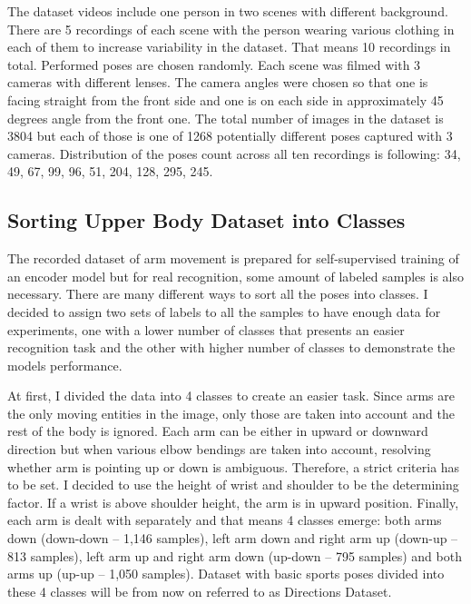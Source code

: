 The dataset videos include one person in two scenes with different background. There are 5 recordings of each scene with the person wearing various clothing in each of them to increase variability in the dataset. That means 10 recordings in total. Performed poses are chosen randomly. Each scene was filmed with 3 cameras with different lenses. The camera angles were chosen so that one is facing straight from the front side and one is on each side in approximately 45 degrees angle from the front one. The total number of images in the dataset is 3804 but each of those is one of 1268 potentially different poses captured with 3 cameras. Distribution of the poses count across all ten recordings is following: 34, 49, 67, 99, 96, 51, 204, 128, 295, 245.

\subsection{\label{sec:dataset-labels}Sorting Upper Body Dataset into Classes}

The recorded dataset of arm movement is prepared for self-supervised training of an encoder model but for real recognition, some amount of labeled samples is also necessary. There are many different ways to sort all the poses into classes. I decided to assign two sets of labels to all the samples to have enough data for experiments, one with a lower number of classes that presents an easier recognition task and the other with higher number of classes to demonstrate the models performance.

At first, I divided the data into 4 classes to create an easier task. Since arms are the only moving entities in the image, only those are taken into account and the rest of the body is ignored. Each arm can be either in upward or downward direction but when various elbow bendings are taken into account, resolving whether arm is pointing up or down is ambiguous. Therefore, a strict criteria has to be set. I decided to use the height of wrist and shoulder to be the determining factor. If a wrist is above shoulder height, the arm is in upward position. Finally, each arm is dealt with separately and that means 4 classes emerge: both arms down (down-down -- 1,146 samples), left arm down and right arm up (down-up -- 813 samples), left arm up and right arm down (up-down -- 795 samples) and both arms up (up-up -- 1,050 samples). Dataset with basic sports poses divided into these 4 classes will be from now on referred to as Directions Dataset.

